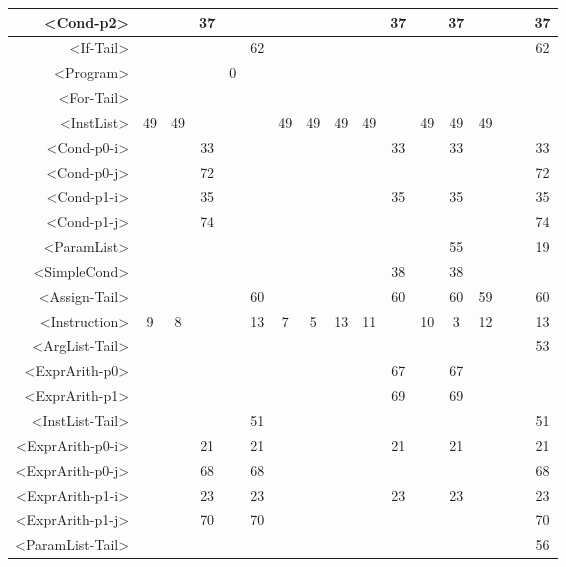 \begin{tabular}{r|c@{ }c@{ }c@{ }c@{ }c@{ }c@{ }c@{ }c@{ }c@{ }c@{ }c@{ }c@{ }c@{ }c@{ }c@{ }c@{ }}
<Cond-p2> &   &   & 37 &   &   &   &   &   &   & 37 &   & 37 &   &   &   & 37 \\\hline
<If-Tail> &   &   &   &   & 62 &   &   &   &   &   &   &   &   &   &   & 62 \\\hline
<Program> &   &   &   & 0 &   &   &   &   &   &   &   &   &   &   &   &   \\\hline
<For-Tail> &   &   &   &   &   &   &   &   &   &   &   &   &   &   &   &   \\\hline
<InstList> & 49 & 49 &   &   &   & 49 & 49 & 49 & 49 &   & 49 & 49 & 49 &   &   &   \\\hline
<Cond-p0-i> &   &   & 33 &   &   &   &   &   &   & 33 &   & 33 &   &   &   & 33 \\\hline
<Cond-p0-j> &   &   & 72 &   &   &   &   &   &   &   &   &   &   &   &   & 72 \\\hline
<Cond-p1-i> &   &   & 35 &   &   &   &   &   &   & 35 &   & 35 &   &   &   & 35 \\\hline
<Cond-p1-j> &   &   & 74 &   &   &   &   &   &   &   &   &   &   &   &   & 74 \\\hline
<ParamList> &   &   &   &   &   &   &   &   &   &   &   & 55 &   &   &   & 19 \\\hline
<SimpleCond> &   &   &   &   &   &   &   &   &   & 38 &   & 38 &   &   &   &   \\\hline
<Assign-Tail> &   &   &   &   & 60 &   &   &   &   & 60 &   & 60 & 59 &   &   & 60 \\\hline
<Instruction> & 9 & 8 &   &   & 13 & 7 & 5 & 13 & 11 &   & 10 & 3 & 12 &   &   & 13 \\\hline
<ArgList-Tail> &   &   &   &   &   &   &   &   &   &   &   &   &   &   &   & 53 \\\hline
<ExprArith-p0> &   &   &   &   &   &   &   &   &   & 67 &   & 67 &   &   &   &   \\\hline
<ExprArith-p1> &   &   &   &   &   &   &   &   &   & 69 &   & 69 &   &   &   &   \\\hline
<InstList-Tail> &   &   &   &   & 51 &   &   &   &   &   &   &   &   &   &   & 51 \\\hline
<ExprArith-p0-i> &   &   & 21 &   & 21 &   &   &   &   & 21 &   & 21 &   &   &   & 21 \\\hline
<ExprArith-p0-j> &   &   & 68 &   & 68 &   &   &   &   &   &   &   &   &   &   & 68 \\\hline
<ExprArith-p1-i> &   &   & 23 &   & 23 &   &   &   &   & 23 &   & 23 &   &   &   & 23 \\\hline
<ExprArith-p1-j> &   &   & 70 &   & 70 &   &   &   &   &   &   &   &   &   &   & 70 \\\hline
<ParamList-Tail> &   &   &   &   &   &   &   &   &   &   &   &   &   &   &   & 56 \\\hline
\end{tabular}



